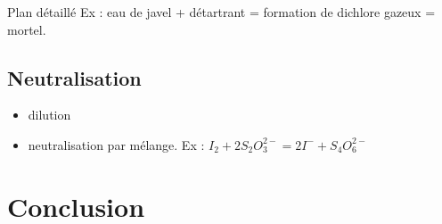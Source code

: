 \begin{reportBlock}{Plan détaillé}
Ex : eau de javel + détartrant = formation de dichlore gazeux = mortel.

\subsection{Neutralisation}

\begin{itemize}
    \item dilution
    \item neutralisation par mélange. Ex : $I_2+2S_2O_3^{2-} = 2I^-+S_4O_6^{2-}$
\end{itemize}
\section{Conclusion} 


\end{reportBlock}